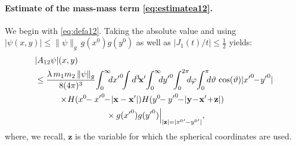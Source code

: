 \documentclass[b5paper,draft,openbib,12pt]{memoir}
\newcommand{\vx}{\mathbf{x}}
\newcommand{\vy}{\mathbf{y}}
\newcommand{\vz}{\mathbf{z}}
\begin{document}
\paragraph{Estimate of the mass-mass term \eqref{eq:estimatea12}.} 
\label{sec:estimatemassmass}
We begin with \eqref{eq:defa12}. Taking the absolute value and using 
$|\psi(x,y)| \leq \| \psi \|_g \, g(x^0) g(y^0)$ as well as 
$|J_1(t)/t|\leq \frac{1}{2}$ yields:
\begin{align}
&|A_{12} \psi|(x,y) \notag\\
&\leq \frac{\lambda \, m_1 m_2 \, \| \psi \|_g}{8(4\pi)^3}\!  \int_0^\infty\!\!\! d{x'}^0\!\! \int d^3 \!\vx' \!\int_0^\infty \!\!\!d{y'}^0 \!\int_0^{2\pi}\!\!\! d\varphi \!\int_{0}^{\pi} \!\!\!d \vartheta \, \cos(\vartheta) |{x'}^0\!\!-\!{y'}^0| \,  \nonumber\\
&\hspace{1cm}\times\! H(x^0\!\!-{x'}^0\!\!-\!|\vx-\vx'|)H(y^0\!\!-{y'}^0\!\!-\!|\vy\!-\!\vx'\!+\!\vz|)\notag\\
&\hspace{3cm} \times g({x'}^0)g({y'}^0)\Big|_{|\vz| = |{x^0}'-{y^0}'|},
\end{align}
where, we recall, $\vz$ is the variable for which the spherical 
coordinates are used.
\end{document}
